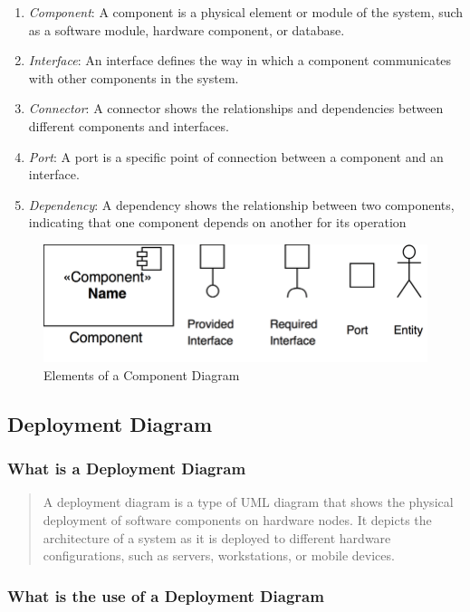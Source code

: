 \documentclass[11pt]{article}
\begin{document}
\begin{enumerate}
	\item \textit{Component}: A component is a physical element or module of the system, such as a software module, hardware component, or database.
	\item \textit{Interface}: An interface defines the way in which a component communicates with other components in the system.
	\item \textit{Connector}: A connector shows the relationships and dependencies between different components and interfaces.
	\item \textit{Port}: A port is a specific point of connection between a component and an interface.
	\item \textit{Dependency}: A dependency shows the relationship between two components, indicating that one component depends on another for its operation
\end{enumerate}

\begin{figure}[H]
	\centering
	\includegraphics[width=.7\textwidth]{UML-component-diagram-notation-elements.png}
	\caption{Elements of a Component Diagram}
\end{figure}


\subsection{Deployment Diagram}

\subsubsection{What is a Deployment Diagram}
\begin{quotation}
	A deployment diagram is a type of UML diagram that shows the physical deployment of software components on hardware nodes. It depicts the architecture of a system as it is deployed to different hardware configurations, such as servers, workstations, or mobile devices.
\end{quotation}
\subsubsection{What is the use of a Deployment Diagram}
\end{document}
